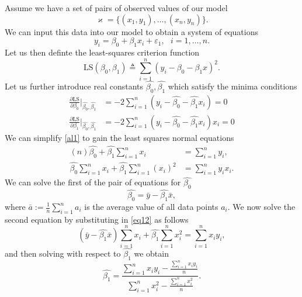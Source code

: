 \documentclass[10pt,a4paper]{article}
\numberwithin{equation}{section}
\theoremstyle{plain}
\theoremstyle{definition}
\theoremstyle{own}
\begin{document}
Assume we have a set of pairs of observed values of our model 
\begin{equation}
\varkappa = \{ (x_1, y_1), \ldots, (x_n, y_n) \}.
\end{equation}
We can input this data into our model to obtain a system of equations
\begin{equation}
y_i = \beta_0 + \beta_1x_i + \varepsilon_1,~~~ i = 1, \ldots, n.
\end{equation}
Let us then definte the least-squares criterion function
\begin{equation}
\mathrm{LS}(\beta_0, \beta_1) \triangleq \sum_{i=1}^n (y_i - \beta_0 - \beta_1x)^2.
\end{equation}
Let us further introduce real constants $\hat{\beta_0}, \hat{\beta_1}$ which satisfy the minima conditions
\begin{align} \label{al1} \nonumber
\frac{\partial \mathrm{LS}}{\partial \beta_0} \Big|_{\hat{\beta_0}, \hat{\beta_1}} & = -2 \sum_{i=1}^n (y_i - \hat{\beta_0} - \hat{\beta_1}x_i) = 0 \\
\frac{\partial \mathrm{LS}}{\partial \beta_1} \Big|_{\hat{\beta_0}, \hat{\beta_1}} & = -2 \sum_{i=1}^n (y_i - \hat{\beta_0} - \hat{\beta_1}x_i)x_i = 0
\end{align}
We can simplify \cref{al1} to gain the least squares normal equations
\begin{align}
\nonumber
(n) \hat{\beta_0} + \hat{\beta_1} \sum_{i=1}^n x_i & = \sum_{i=1}^n y_i, \\
 \hat{\beta_0} \sum_{i=1}^n x_i + \hat{\beta_1} \sum_{i=1}^n (x_i)^2 & = \sum_{i=1}^n y_i x_i.
\end{align}
We can solve the first of the pair of equations for $\hat{\beta_0}$
\begin{equation} \label{eq12}
\hat{\beta_0} = \bar{y} - \hat{\beta_1} \bar{x},
\end{equation}
where $\bar{a} := \frac{1}{n} \sum_{i = 1}^n a_i$ is the average value of all data points $a_i$. We now solve the second equation by substituting in \cref{eq12} as follows
\begin{equation} \label{eq13}
(\bar{y} - \hat{\beta_1} \bar{x}) \sum_{i=1}^n x_i + \hat{\beta_1} \sum_{i=1}^n x_i^2 = \sum_{i=1}^n x_i y_i,
\end{equation}
and then solving with respect to $\hat{\beta_1}$ we obtain
\begin{equation} \label{eq14}
\hat{\beta_1} = \frac{\sum_{i=1}^n x_i y_i - \frac{\sum_{i = 1}^n x_i y_i}{n}}{\sum_{i=1}^n x_i^2 - \frac{\sum_{i=1}^n x_i^2}{n}}.
\end{equation}
\end{document}

